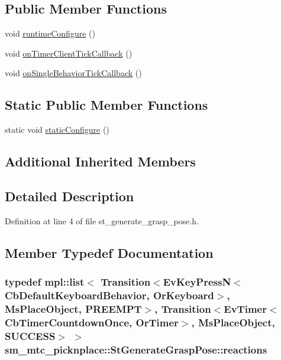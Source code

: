 \subsection*{Public Member Functions}
\begin{DoxyCompactItemize}
\item 
void \hyperlink{structsm__mtc__picknplace_1_1StGenerateGraspPose_a02d75d1e06c77e400563ebf35e15d573}{runtime\+Configure} ()
\item 
void \hyperlink{structsm__mtc__picknplace_1_1StGenerateGraspPose_a97e62141e87e1e256ac09d7af87d2a32}{on\+Timer\+Client\+Tick\+Callback} ()
\item 
void \hyperlink{structsm__mtc__picknplace_1_1StGenerateGraspPose_aa4668520cd1e81522ea715eea641d6bc}{on\+Single\+Behavior\+Tick\+Callback} ()
\end{DoxyCompactItemize}
\subsection*{Static Public Member Functions}
\begin{DoxyCompactItemize}
\item 
static void \hyperlink{structsm__mtc__picknplace_1_1StGenerateGraspPose_a14c992fc248d055735871487949d0f9f}{static\+Configure} ()
\end{DoxyCompactItemize}
\subsection*{Additional Inherited Members}


\subsection{Detailed Description}


Definition at line 4 of file st\+\_\+generate\+\_\+grasp\+\_\+pose.\+h.



\subsection{Member Typedef Documentation}
\subsubsection[{\texorpdfstring{reactions}{reactions}}]{\setlength{\rightskip}{0pt plus 5cm}typedef mpl\+::list$<$ Transition$<$Ev\+Key\+PressN$<$Cb\+Default\+Keyboard\+Behavior, {\bf Or\+Keyboard}$>$, {\bf Ms\+Place\+Object}, {\bf P\+R\+E\+E\+M\+PT}$>$, Transition$<$Ev\+Timer$<$Cb\+Timer\+Countdown\+Once, {\bf Or\+Timer}$>$, {\bf Ms\+Place\+Object}, {\bf S\+U\+C\+C\+E\+SS}$>$ $>$ {\bf sm\+\_\+mtc\+\_\+picknplace\+::\+St\+Generate\+Grasp\+Pose\+::reactions}}\hypertarget{structsm__mtc__picknplace_1_1StGenerateGraspPose_af9b6e634fea582e30f5da61ad59d50b4}{}\label{structsm__mtc__picknplace_1_1StGenerateGraspPose_af9b6e634fea582e30f5da61ad59d50b4}



